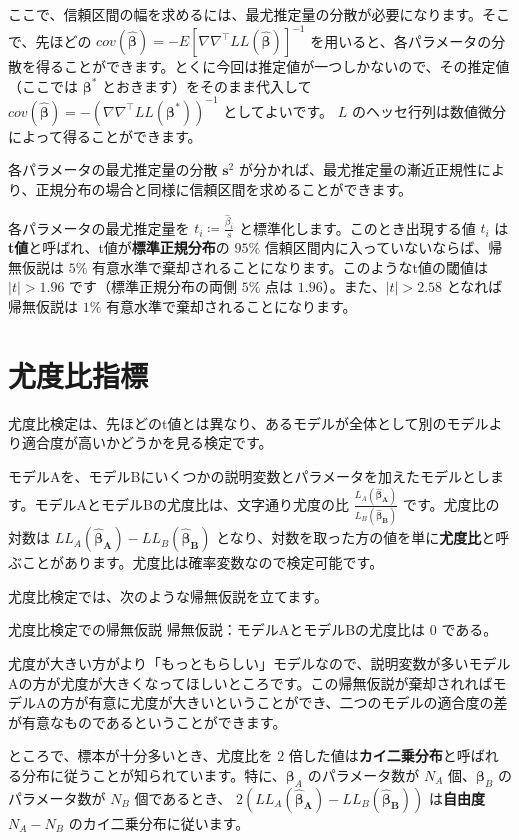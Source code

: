 ここで、信頼区間の幅を求めるには、最尤推定量の分散が必要になります。そこで、先ほどの $cov(\bm{\hat\beta}) = -E\left[\nabla\nabla^\top LL(\bm{\hat\beta})\right]^{-1}$ を用いると、各パラメータの分散を得ることができます。とくに今回は推定値が一つしかないので、その推定値（ここでは $\bm\beta^*$ とおきます）をそのまま代入して $cov(\bm{\hat\beta}) = -\left(\nabla\nabla^\top LL(\bm\beta^*)\right)^{-1}$ としてよいです。 $L$ のヘッセ行列は数値微分によって得ることができます。

各パラメータの最尤推定量の分散 $\bm s^2$ が分かれば、最尤推定量の漸近正規性により、正規分布の場合と同様に信頼区間を求めることができます。

各パラメータの最尤推定量を $t_i\coloneq\frac{\hat\beta_i}{s}$ と標準化します。このとき出現する値 $t_i$ は\textbf{t値}と呼ばれ、t値が\textbf{標準正規分布}の $95\%$ 信頼区間内に入っていないならば、帰無仮説は $5\%$ 有意水準で棄却されることになります。このようなt値の閾値は $|t|>1.96$ です（標準正規分布の両側 $5\%$ 点は $1.96$）。また、$|t|>2.58$ となれば帰無仮説は $1\%$ 有意水準で棄却されることになります。

\section{尤度比指標}\label{sec:likelihood_ratio}

尤度比検定は、先ほどのt値とは異なり、あるモデルが全体として別のモデルより適合度が高いかどうかを見る検定です。

モデルAを、モデルBにいくつかの説明変数とパラメータを加えたモデルとします。モデルAとモデルBの尤度比は、文字通り尤度の比 $\frac{L_A(\bm{\hat\beta_A})}{L_B(\bm{\hat\beta_B})}$ です。尤度比の対数は $LL_A(\bm{\hat\beta_A})-LL_B(\bm{\hat\beta_B})$ となり、対数を取った方の値を単に\textbf{尤度比}と呼ぶことがあります。尤度比は確率変数なので検定可能です。

尤度比検定では、次のような帰無仮説を立てます。

\begin{itembox}[l]{尤度比検定での帰無仮説}
    帰無仮説：モデルAとモデルBの尤度比は $0$ である。
\end{itembox}

尤度が大きい方がより「もっともらしい」モデルなので、説明変数が多いモデルAの方が尤度が大きくなってほしいところです。この帰無仮説が棄却されればモデルAの方が有意に尤度が大きいということができ、二つのモデルの適合度の差が有意なものであるということができます。

ところで、標本が十分多いとき、尤度比を $2$ 倍した値は\textbf{カイ二乗分布}と呼ばれる分布に従うことが知られています。特に、$\bm\beta_A$ のパラメータ数が $N_A$ 個、$\bm\beta_B$ のパラメータ数が $N_B$ 個であるとき、 $2(LL_A(\bm{\hat\beta_A})-LL_B(\bm{\hat\beta_B}))$ は\textbf{自由度} $N_A-N_B$ のカイ二乗分布に従います。

